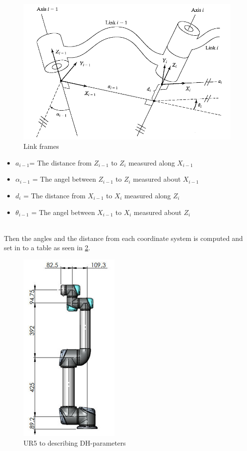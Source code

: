 \begin{figure}[H]
    \centering
    \includegraphics[width=\textwidth]{Design/Afstand.PNG}
    \caption{Link frames \cite{JohnC}}
    \label{fig:linkFrame}
\end{figure}

\begin{itemize}
    \item ${a_{i-1}}$= The distance from ${Z_{i-1}}$ to ${Z_{i}}$ measured along ${X_{i-1}}$
    \item ${\alpha_{i-1}}$ = The angel between ${Z_{i-1}}$ to ${Z_{i}}$ measured about ${X_{i-1}}$
    \item ${d_{i}}$ = The distance from ${X_{i-1}}$ to ${X_{i}}$ measured along ${Z_{i}}$
    \item ${\theta_{i-1}}$ = The angel between ${X_{i-1}}$ to ${X_{i}}$ measured about ${Z_{i}}$
\end{itemize}

\\
Then the angles and the distance from each coordinate system is computed and set in to a table as seen in \ref{fig:DH-Table}.

\begin{figure}[h!]
    \centering
    \includegraphics[scale=0.79]{Design/UR5measure.png}
    \caption{UR5 to describing DH-parameters \cite{DH}} 
    \label{fig:DH-Table} 
\end{figure}

